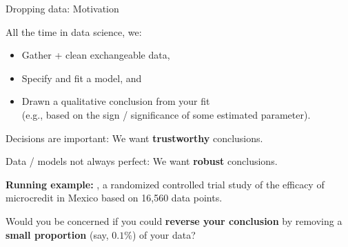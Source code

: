 \begin{frame}{Dropping data: Motivation}

All the time in data science, we:

\begin{itemize}
    \item Gather + clean exchangeable data,
    \item Specify and fit a model, and
    \item Drawn a qualitative conclusion from your fit
    \\(e.g., based on the sign / significance of
        some estimated parameter).
\end{itemize}

\vspace{1em}
Decisions are important: We want \textbf{trustworthy} conclusions.

Data / models not always perfect: We want \textbf{robust} conclusions.

\vspace{1em}
\textbf{Running example:} \citet{angelucci2015microcredit}, a
randomized controlled trial study of the efficacy of microcredit in Mexico based
on 16,560 data points.

\vspace{1em}
Would you be concerned if you could \textbf{reverse your conclusion} by removing
a \textbf{small proportion} (say, $0.1\%$) of your data?

\end{frame}


